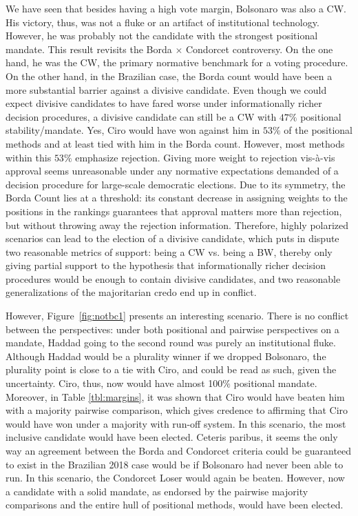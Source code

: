\documentclass[hidelinks,11pt]{article} \usepackage[utf8]{inputenc}
\begin{document}
We have seen that besides having a high vote margin, Bolsonaro was also a CW. His victory, thus, was not a fluke or an artifact of institutional technology. However, he was probably not the candidate with the strongest positional mandate. This result revisits the Borda \(\times\) Condorcet controversy. On the one hand, he was the CW, the primary normative benchmark for a voting procedure. On the other hand, in the Brazilian case, the Borda count would have been a more substantial barrier against a divisive candidate. Even though we could expect divisive candidates to have fared worse under informationally richer decision procedures, a divisive candidate can still be a CW with \(47\%\) positional stability/mandate. Yes, Ciro would have won against him in \(53\%\) of the positional methods and at least tied with him in the Borda count. However, most methods within this \(53\%\) emphasize rejection. Giving more weight to rejection vis-\`a-vis approval seems unreasonable under any normative expectations demanded of a decision procedure for large-scale democratic elections. Due to its symmetry, the Borda Count lies at a threshold: its constant decrease in assigning weights to the positions in the rankings guarantees that approval matters more than rejection, but without throwing away the rejection information. Therefore, highly polarized scenarios can lead to the election of a divisive candidate, which puts in dispute two reasonable metrics of support: being a CW vs. being a BW, thereby only giving partial support to the hypothesis that informationally richer decision procedures would be enough to contain divisive candidates, and two reasonable generalizations of the majoritarian credo end up in conflict.

However, Figure~\ref{fig:notbc1} presents an interesting scenario. There is no conflict between the perspectives: under both positional and pairwise perspectives on a mandate, Haddad going to the second round was purely an institutional fluke. Although Haddad would be a plurality winner if we dropped Bolsonaro, the plurality point is close to a tie with Ciro, and could be read as such, given the uncertainty. Ciro, thus, now would have almost 100\(\%\) positional mandate. Moreover, in Table \ref{tbl:margins}, it was shown that Ciro would have beaten him with a majority pairwise comparison, which gives credence to affirming that Ciro would have won under a majority with run-off system. In this scenario, the most inclusive candidate would have been elected. Ceteris paribus, it seems the only way an agreement between the Borda and Condorcet criteria could be guaranteed to exist in the Brazilian 2018 case would be if Bolsonaro had never been able to run. In this scenario, the Condorcet Loser would again be beaten. However, now a candidate with a solid mandate, as endorsed by the pairwise majority comparisons and the entire hull of positional methods, would have been elected.
\end{document}
